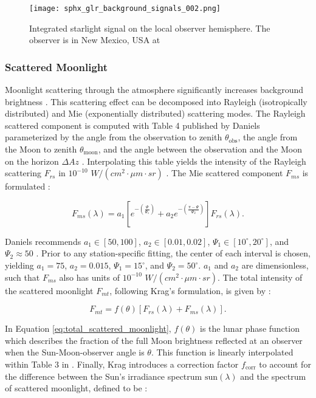 \begin{figure}[ht]
  \centering
  \texttt{[image: sphx\_glr\_background\_signals\_002.png]}
  \caption{Integrated starlight signal on the local observer hemisphere. The observer is in New Mexico, USA at
  \pogslla}
  \label{fig:starlight_hemi}
\end{figure}

\subsubsection{Scattered Moonlight}

Moonlight scattering through the atmosphere significantly increases background brightness \cite{krag2003}. This scattering effect can be decomposed into Rayleigh (isotropically distributed) and Mie (exponentially distributed) scattering modes. The Rayleigh scattered component is computed with Table 4 published by Daniels parameterized by the angle from the observation to zenith $\theta_\mathrm{obs}$, the angle from the Moon to zenith $\theta_\mathrm{moon}$, and the angle between the observation and the Moon on the horizon $\Delta Az$ \cite{daniels1977}. Interpolating this table yields the intensity of the Rayleigh scattering $F_{rs}$ in $10^{-10}$ $W/(cm^2 \cdot \mu m \cdot sr)$ \cite{krag2003}. The Mie scattered component $F_{ms}$ is formulated \cite{krag2003}:

\begin{equation} \label{eq:mie_scattering_moon}
  F_{ms}(\lambda) = a_1 \left[ e^{-\left(\frac{\Psi}{\Psi_1}\right)} + a_2 e^{-\left(\frac{\pi - \Psi}{\Psi_2}\right)} \right] F_{rs}(\lambda).
\end{equation}

Daniels recommends $a_1 \in [50, 100]$, $a_2 \in [0.01, 0.02]$, $\Psi_1 \in [10^\circ, 20^\circ]$, and $\Psi_2 \approx 50$ \cite{daniels1977}. Prior to any station-specific fitting, the center of each interval is chosen, yielding $a_1 = 75$, $a_2 = 0.015$, $\Psi_1 = 15^\circ$, and $\Psi_2 = 50^\circ$. $a_1$ and $a_2$ are dimensionless, such that $F_{ms}$ also has units of $10^{-10}$ $W/(cm^2 \cdot \mu m \cdot sr)$. The total intensity of the scattered moonlight $F_{mt}$, following Krag's formulation, is given by \cite{krag2003}:

\begin{equation} \label{eq:total_scattered_moonlight}
  F_{mt} = f(\theta) \left[ F_{rs}(\lambda) + F_{ms}(\lambda) \right].
\end{equation}

In Equation \ref{eq:total_scattered_moonlight}, $f(\theta)$ is the lunar phase function which describes the fraction of the full Moon brightness reflected at an observer when the Sun-Moon-observer angle is $\theta$. This function is linearly interpolated within Table 3 in \cite{daniels1977}. Finally, Krag introduces a correction factor $f_\mathrm{corr}$ to account for the difference between the Sun's irradiance spectrum $\mathrm{sun}(\lambda)$ and the spectrum of scattered moonlight, defined to be \cite{krag2003}:

